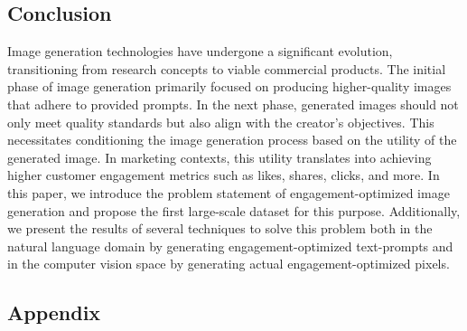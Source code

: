 \subsection{Conclusion}
Image generation technologies have undergone a significant evolution, transitioning from research concepts to viable commercial products. The initial phase of image generation primarily focused on producing higher-quality images that adhere to provided prompts. In the next phase, generated images should not only meet quality standards but also align with the creator's objectives. This necessitates conditioning the image generation process based on the utility of the generated image. In marketing contexts, this utility translates into achieving higher customer engagement metrics such as likes, shares, clicks, and more. In this paper, we introduce the problem statement of engagement-optimized image generation and propose the first large-scale dataset for this purpose. Additionally, we present the results of several techniques to solve this problem both in the natural language domain by generating engagement-optimized text-prompts and in the computer vision space by generating actual engagement-optimized pixels. 





\subsection{Appendix}



 
